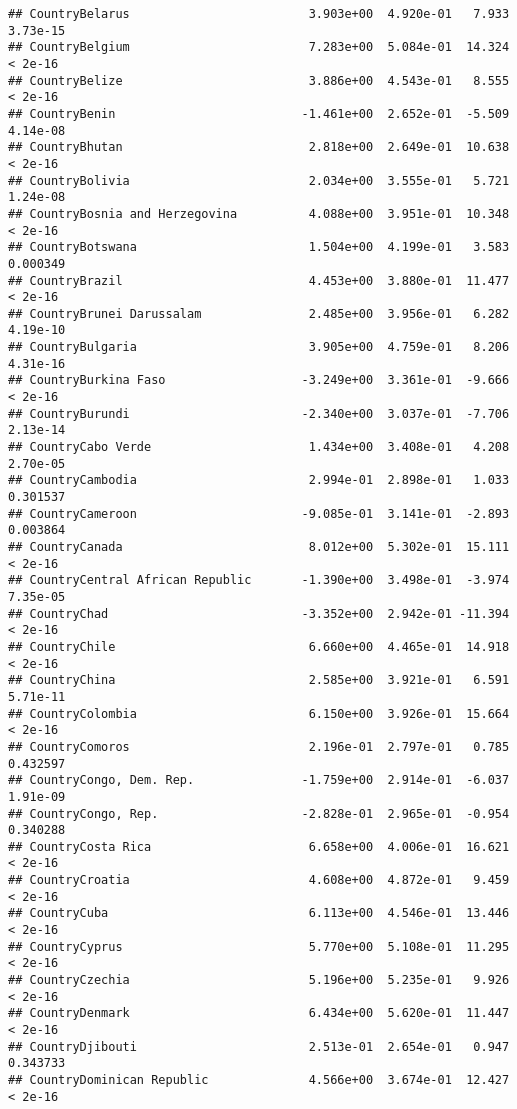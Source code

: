 \documentclass[
]{article}
\begin{document}
\begin{verbatim}
## CountryBelarus                         3.903e+00  4.920e-01   7.933 3.73e-15
## CountryBelgium                         7.283e+00  5.084e-01  14.324  < 2e-16
## CountryBelize                          3.886e+00  4.543e-01   8.555  < 2e-16
## CountryBenin                          -1.461e+00  2.652e-01  -5.509 4.14e-08
## CountryBhutan                          2.818e+00  2.649e-01  10.638  < 2e-16
## CountryBolivia                         2.034e+00  3.555e-01   5.721 1.24e-08
## CountryBosnia and Herzegovina          4.088e+00  3.951e-01  10.348  < 2e-16
## CountryBotswana                        1.504e+00  4.199e-01   3.583 0.000349
## CountryBrazil                          4.453e+00  3.880e-01  11.477  < 2e-16
## CountryBrunei Darussalam               2.485e+00  3.956e-01   6.282 4.19e-10
## CountryBulgaria                        3.905e+00  4.759e-01   8.206 4.31e-16
## CountryBurkina Faso                   -3.249e+00  3.361e-01  -9.666  < 2e-16
## CountryBurundi                        -2.340e+00  3.037e-01  -7.706 2.13e-14
## CountryCabo Verde                      1.434e+00  3.408e-01   4.208 2.70e-05
## CountryCambodia                        2.994e-01  2.898e-01   1.033 0.301537
## CountryCameroon                       -9.085e-01  3.141e-01  -2.893 0.003864
## CountryCanada                          8.012e+00  5.302e-01  15.111  < 2e-16
## CountryCentral African Republic       -1.390e+00  3.498e-01  -3.974 7.35e-05
## CountryChad                           -3.352e+00  2.942e-01 -11.394  < 2e-16
## CountryChile                           6.660e+00  4.465e-01  14.918  < 2e-16
## CountryChina                           2.585e+00  3.921e-01   6.591 5.71e-11
## CountryColombia                        6.150e+00  3.926e-01  15.664  < 2e-16
## CountryComoros                         2.196e-01  2.797e-01   0.785 0.432597
## CountryCongo, Dem. Rep.               -1.759e+00  2.914e-01  -6.037 1.91e-09
## CountryCongo, Rep.                    -2.828e-01  2.965e-01  -0.954 0.340288
## CountryCosta Rica                      6.658e+00  4.006e-01  16.621  < 2e-16
## CountryCroatia                         4.608e+00  4.872e-01   9.459  < 2e-16
## CountryCuba                            6.113e+00  4.546e-01  13.446  < 2e-16
## CountryCyprus                          5.770e+00  5.108e-01  11.295  < 2e-16
## CountryCzechia                         5.196e+00  5.235e-01   9.926  < 2e-16
## CountryDenmark                         6.434e+00  5.620e-01  11.447  < 2e-16
## CountryDjibouti                        2.513e-01  2.654e-01   0.947 0.343733
## CountryDominican Republic              4.566e+00  3.674e-01  12.427  < 2e-16

\end{verbatim}
\end{document}
